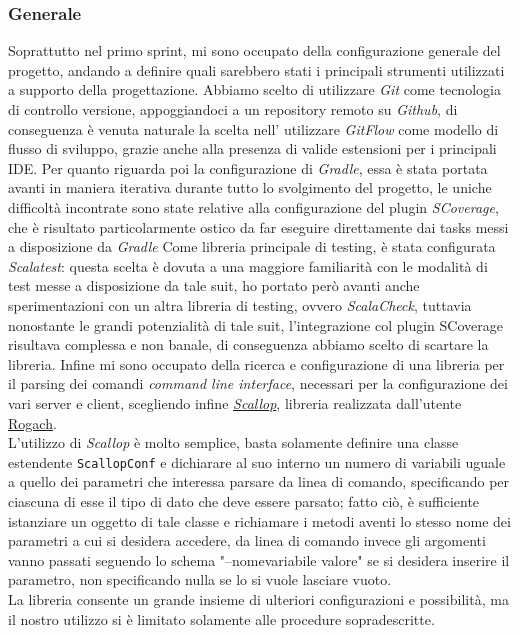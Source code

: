 \subsubsection{Generale}
Soprattutto nel primo sprint, mi sono occupato della configurazione generale del progetto, andando a definire quali sarebbero stati i principali strumenti utilizzati a supporto della progettazione.
Abbiamo scelto di utilizzare \textit{Git} come tecnologia di controllo versione, appoggiandoci a un repository remoto su \textit{Github}, di conseguenza è venuta naturale la scelta nell' utilizzare \textit{GitFlow} come modello di flusso di sviluppo, grazie anche alla presenza di valide estensioni per i principali IDE.
Per quanto riguarda poi la configurazione di \textit{Gradle}, essa è stata portata avanti in maniera iterativa durante tutto lo svolgimento del progetto, le uniche difficoltà incontrate sono state relative alla configurazione del plugin \textit{SCoverage}, che è risultato particolarmente ostico da far eseguire direttamente dai tasks messi a disposizione da \textit{Gradle}
Come libreria principale di testing, è stata configurata \textit{Scalatest}: questa scelta è dovuta a una maggiore familiarità con le modalità di test messe a disposizione da tale suit, ho portato però avanti anche sperimentazioni con un altra libreria di testing, ovvero \textit{ScalaCheck}, tuttavia nonostante le grandi potenzialità di tale suit, l'integrazione col plugin SCoverage risultava complessa e non banale, di conseguenza abbiamo scelto di scartare la libreria.
Infine mi sono occupato della ricerca e configurazione di una libreria per il parsing dei comandi \textit{command line interface}, necessari per la configurazione dei vari server e client, scegliendo infine \href{https://github.com/scallop/scallop}{\textit{Scallop}}, libreria realizzata dall'utente \href{https://github.com/Rogach}{Rogach}.\\
L'utilizzo di \textit{Scallop} è molto semplice, basta solamente definire una classe estendente \texttt{ScallopConf} e dichiarare al suo interno un numero di variabili uguale a quello dei parametri che interessa parsare da linea di comando, specificando per ciascuna di esse il tipo di dato che deve essere parsato; fatto ciò, è sufficiente istanziare un oggetto di tale classe e richiamare i metodi aventi lo stesso nome dei parametri a cui si desidera accedere, da linea di comando invece gli argomenti vanno passati seguendo lo schema "--nomevariabile valore" se si desidera inserire il parametro, non specificando nulla se lo si vuole lasciare vuoto.\\
La libreria consente un grande insieme di ulteriori configurazioni e possibilità, ma il nostro utilizzo si è limitato solamente alle procedure sopradescritte.


